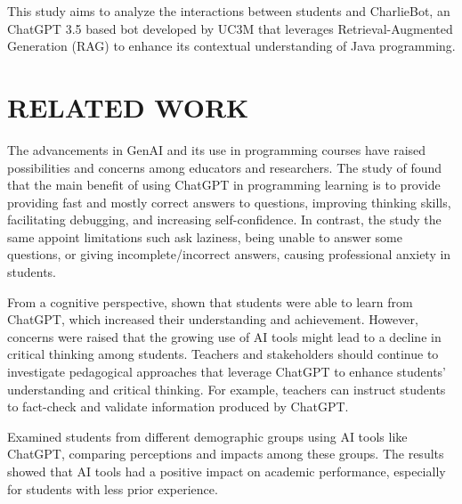 \documentclass[a4paper,twoside]{article}
\begin{document}

This study aims to analyze the interactions between students and CharlieBot,
an ChatGPT 3.5 based bot developed by UC3M that leverages Retrieval-Augmented
Generation (RAG) to enhance its contextual understanding of Java programming.

\section{\uppercase{Related Work}}

The advancements in GenAI and its use in programming courses have raised
possibilities and concerns among educators and researchers. The study of
\cite{Yilmaz23} found that the main benefit of using ChatGPT in programming
learning is to provide providing fast and mostly correct answers to questions,
improving thinking skills, facilitating debugging, and increasing
self-confidence. In contrast, the study the same appoint limitations such ask
laziness, being unable to answer some questions, or giving incomplete/incorrect
answers, causing professional anxiety in students.

From a cognitive perspective, \cite{Lo24} shown that students were able to
learn from ChatGPT, which increased their understanding and achievement.
However, concerns were raised that the growing use of AI tools might lead to a
decline in critical thinking among students. Teachers and stakeholders should
continue to investigate pedagogical approaches that leverage ChatGPT to enhance
students' understanding and critical thinking. For example, teachers can
instruct students to fact-check and validate information produced by ChatGPT.

Examined students from different demographic groups using AI tools like
ChatGPT, comparing perceptions and impacts among these groups. The results
showed that AI tools had a positive impact on academic performance, especially
for students with less prior experience.

\end{document}
